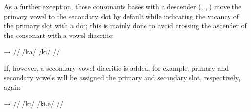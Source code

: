 As a further exception, those consonants bases with a descender (, 
, ) move the primary vowel to the secondary slot by default while 
indicating the vacancy of the primary slot with a dot; this is mainly done to 
avoid crossing the ascender of the consonant with a vowel diacritic:

\pex[everygla=\upshape\Large,glwordalign=center,aboveglbskip=0.5em]\begingl
	\gla {}	→	 //
	\glb /ka/	{}	/ki/ //
\endgl\xe

\noindent If, however, a secondary vowel diacritic is added, for example, 
primary and secondary vowels will be assigned the primary and secondary slot, 
respectively, again:

\pex[everygla=\upshape\Large,glwordalign=center,aboveglbskip=0.5em]\begingl
	\gla {}	→	 //
	\glb /ki/	{}	/ki.e/ //
\endgl\xe

